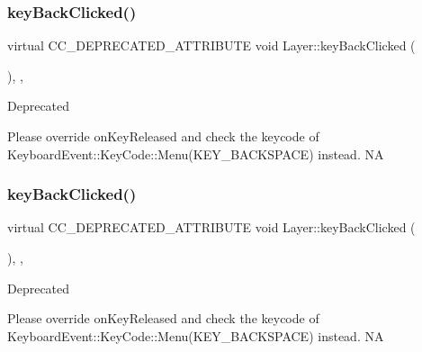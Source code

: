 \subsubsection{\texorpdfstring{key\+Back\+Clicked()}{keyBackClicked()}\hspace{0.1cm}{\footnotesize\ttfamily [1/2]}}
{\footnotesize\ttfamily virtual C\+C\+\_\+\+D\+E\+P\+R\+E\+C\+A\+T\+E\+D\+\_\+\+A\+T\+T\+R\+I\+B\+U\+TE void Layer\+::key\+Back\+Clicked (\begin{DoxyParamCaption}{ }\end{DoxyParamCaption})\hspace{0.3cm}{\ttfamily [inline]}, {\ttfamily [final]}, {\ttfamily [virtual]}}

\begin{DoxyRefDesc}{Deprecated}
\item[\hyperlink{deprecated__deprecated000027}{Deprecated}]Please override on\+Key\+Released and check the keycode of Keyboard\+Event\+::\+Key\+Code\+::\+Menu(\+K\+E\+Y\+\_\+\+B\+A\+C\+K\+S\+P\+A\+C\+E) instead.  NA \end{DoxyRefDesc}
\mbox{\label{classLayer_aea2ec8f77681b4fd1c988bbeeb3d1c22}} 
\subsubsection{\texorpdfstring{key\+Back\+Clicked()}{keyBackClicked()}\hspace{0.1cm}{\footnotesize\ttfamily [2/2]}}
{\footnotesize\ttfamily virtual C\+C\+\_\+\+D\+E\+P\+R\+E\+C\+A\+T\+E\+D\+\_\+\+A\+T\+T\+R\+I\+B\+U\+TE void Layer\+::key\+Back\+Clicked (\begin{DoxyParamCaption}{ }\end{DoxyParamCaption})\hspace{0.3cm}{\ttfamily [inline]}, {\ttfamily [final]}, {\ttfamily [virtual]}}

\begin{DoxyRefDesc}{Deprecated}
\item[\hyperlink{deprecated__deprecated000257}{Deprecated}]Please override on\+Key\+Released and check the keycode of Keyboard\+Event\+::\+Key\+Code\+::\+Menu(\+K\+E\+Y\+\_\+\+B\+A\+C\+K\+S\+P\+A\+C\+E) instead.  NA \end{DoxyRefDesc}
\mbox{\label{classLayer_a8f3ccce82635e42a9c01346bdfa163ec}} 
